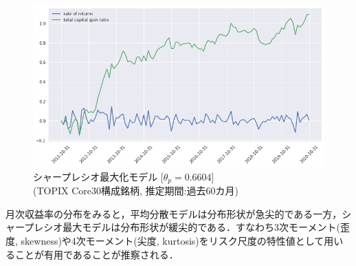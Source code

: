 \documentclass[dvipdfmx,autodetect-engine]{jsarticle}
\begin{document}
\begin{figure}[htbp]
\begin{minipage}{0.5\hsize}
\begin{center}
\includegraphics[width=1.0\hsize]{./figures/srmp_tpx30_w=60_plot.png}
\end{center}
\caption{シャープレシオ最大化モデル [$\theta_p=0.6604$]\\(TOPIX Core30構成銘柄, 推定期間:過去60カ月)}
\label{fig:32}
\end{minipage}
\end{figure}

\newpage

月次収益率の分布をみると，平均分散モデルは分布形状が急尖的である一方，シャープレシオ最大モデルは分布形状が緩尖的である．すなわち3次モーメント(歪度, skewness)や4次モーメント(尖度, kurtosis)をリスク尺度の特性値として用いることが有用であることが推察される．
\end{document}
